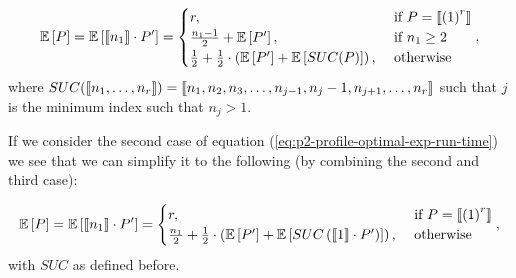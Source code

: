 \begin{equation}
  \label{eq:p2-profile-optimal-exp-run-time}
  \mathbb{E}\left[ P \right] =
  \mathbb{E}\left[ \left\llbracket n_1 \right\rrbracket \cdot P' \right] =
  \begin{cases}
    r, & \text{ if } P = \left\llbracket {(1)}^{r} \right\rrbracket \\
    \frac{n_1-1}{2} + \mathbb{E}\left[ P' \right] , & \text{ if } n_1\geq 2 \\
    \frac{1}{2} + \frac{1}{2} \cdot \left( \mathbb{E}\left[ P' \right] + \mathbb{E}\left[ SUC(P) \right] \right) ,& \text{ otherwise } 
  \end{cases},
\end{equation}
where $SUC(\left\llbracket n_1,\dots,n_r \right\rrbracket) = \left\llbracket n_1, n_2, n_3,\dots,n_{j-1},n_j-1,n_{j+1},\dots,n_r \right\rrbracket$ such that $j$ is the minimum index such that $n_j>1$.

If we consider the second case of equation (\ref{eq:p2-profile-optimal-exp-run-time}) we see that we can simplify it to the following (by combining the second and third case):

\begin{equation}
  \label{eq:p2-profile-optimal-exp-run-time-def-simplified}
  \mathbb{E}\left[ P \right] =
  \mathbb{E}\left[ \left\llbracket n_1 \right\rrbracket \cdot P' \right] =
  \begin{cases}
    r, & \text{ if } P= \left\llbracket {(1)}^{r} \right\rrbracket \\
    \frac{n_1}{2} + \frac{1}{2} \cdot \left( \mathbb{E}\left[ P' \right] + \mathbb{E}\left[ SUC\left(\left\llbracket 1 \right\rrbracket\cdot P'\right) \right] \right) ,& \text{ otherwise } \\
  \end{cases},
\end{equation}
with $SUC$ as defined before. 

